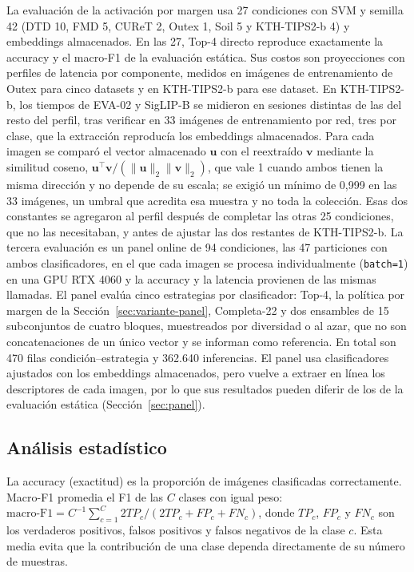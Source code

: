 \documentclass[a4paper,fleqn]{cas-sc}
\begin{document}
La evaluación de la activación por margen usa 27 condiciones con SVM y semilla 42 (DTD 10, FMD 5, CUReT 2, Outex 1, Soil 5 y KTH-TIPS2-b 4) y embeddings almacenados. En las 27, Top-4 directo reproduce exactamente la accuracy y el macro-F1 de la evaluación estática. Sus costos son proyecciones con perfiles de latencia por componente, medidos en imágenes de entrenamiento de Outex para cinco datasets y en KTH-TIPS2-b para ese dataset. En KTH-TIPS2-b, los tiempos de EVA-02 y SigLIP-B se midieron en sesiones distintas de las del resto del perfil, tras verificar en 33 imágenes de entrenamiento por red, tres por clase, que la extracción reproducía los embeddings almacenados. Para cada imagen se comparó el vector almacenado $\mathbf{u}$ con el reextraído $\mathbf{v}$ mediante la similitud coseno, $\mathbf{u}^{\top}\mathbf{v}/(\lVert\mathbf{u}\rVert_2\lVert\mathbf{v}\rVert_2)$, que vale 1 cuando ambos tienen la misma dirección y no depende de su escala; se exigió un mínimo de 0,999 en las 33 imágenes, un umbral que acredita esa muestra y no toda la colección. Esas dos constantes se agregaron al perfil después de completar las otras 25 condiciones, que no las necesitaban, y antes de ajustar las dos restantes de KTH-TIPS2-b. La tercera evaluación es un panel online de 94 condiciones, las 47 particiones con ambos clasificadores, en el que cada imagen se procesa individualmente (\texttt{batch=1}) en una GPU RTX 4060 y la accuracy y la latencia provienen de las mismas llamadas. El panel evalúa cinco estrategias por clasificador: Top-4, la política por margen de la Sección~\ref{sec:variante-panel}, Completa-22 y dos ensambles de 15 subconjuntos de cuatro bloques, muestreados por diversidad o al azar, que no son concatenaciones de un único vector y se informan como referencia. En total son 470 filas condición--estrategia y 362.640 inferencias. El panel usa clasificadores ajustados con los embeddings almacenados, pero vuelve a extraer en línea los descriptores de cada imagen, por lo que sus resultados pueden diferir de los de la evaluación estática (Sección~\ref{sec:panel}).

\subsection{Análisis estadístico}\label{sec:analisis-estadistico}

La accuracy (exactitud) es la proporción de imágenes clasificadas correctamente. Macro-F1 promedia el F1 de las $C$ clases con igual peso: $\mathrm{macro\mbox{-}F1}=C^{-1}\sum_{c=1}^{C}2TP_c/(2TP_c+FP_c+FN_c)$, donde $TP_c$, $FP_c$ y $FN_c$ son los verdaderos positivos, falsos positivos y falsos negativos de la clase $c$. Esta media evita que la contribución de una clase dependa directamente de su número de muestras.
\end{document}

